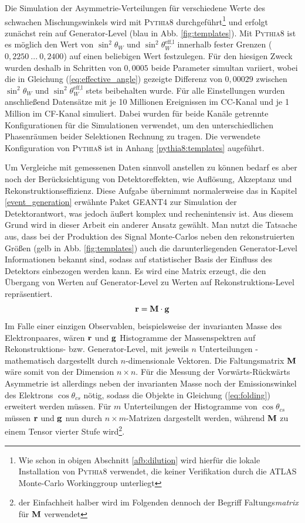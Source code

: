 Die Simulation der Asymmetrie-Verteilungen für verschiedene Werte des schwachen
Mischungswinkels wird mit \textsc{Pythia8} durchgeführt\footnote{Wie schon in
obigen Abschnitt \ref{afb:dilution} wird hierfür die lokale Installation von
\textsc{Pythia8} verwendet, die keiner Verifikation durch die ATLAS Monte-Carlo
Workinggroup unterliegt} und erfolgt zunächst rein auf Generator-Level (blau in
Abb. \ref{fig:templates}). Mit \textsc{Pythia8} ist es möglich den Wert von
$\sin^2\theta_W$ und $\sin^2\theta_W^\text{eff,l}$ innerhalb fester Grenzen
($0,2250 \: ... \: 0,2400$) auf einen beliebigen Wert festzulegen. Für den
hiesigen Zweck wurden deshalb in Schritten von $0,0005$ beide Parameter
simultan variiert, wobei die in Gleichung (\ref{eq:effective_angle}) gezeigte
Differenz von $0,00029$ zwischen $\sin^2\theta_W$ und
$\sin^2\theta_W^\text{eff,l}$ stets beibehalten wurde. Für alle Einstellungen
wurden anschließend Datensätze mit je 10 Millionen Ereignissen im \ac{CC}-Kanal
und je 1 Million im \ac{CF}-Kanal simuliert. Dabei wurden für beide Kanäle
getrennte Konfigurationen für die Simulationen verwendet, um den
unterschiedlichen Phasenräumen beider Selektionen Rechnung zu tragen. Die
verwendete Konfiguration von \textsc{Pythia8} ist in Anhang
\ref{pythia8:templates} augeführt.

Um Vergleiche mit gemessenen Daten sinnvoll anstellen zu können bedarf es
aber noch der Berücksichtigung von Detektoreffekten, wie Auflösung, Akzeptanz
und Rekonstruktionseffizienz. Diese Aufgabe übernimmt normalerweise das in
Kapitel \ref{event_generation} erwähnte Paket \textsc{GEANT4} zur Simulation
der Detektorantwort, was jedoch äußert komplex und rechenintensiv ist. Aus
diesem Grund wird in dieser Arbeit ein anderer Ansatz gewählt. Man nutzt die
Tatsache aus, dass bei der Produktion des Signal Monte-Carlos neben den
rekonstruierten Größen (gelb in Abb. \ref{fig:templates}) auch die
darunterliegenden Generator-Level Informationen bekannt sind, sodass auf
statistischer Basis der Einfluss des Detektors einbezogen werden kann. Es wird
eine Matrix erzeugt, die den Übergang von Werten auf Generator-Level zu Werten
auf Rekonstruktions-Level repräsentiert.
\begin{equation}
    \bf r = M \cdot \bf{g}
    \label{eq:folding}
\end{equation}
Im Falle einer einzigen Observablen, beispielsweise der invarianten Masse des
Elektronpaares, wären $\bf{r}$ und $\bf{g}$ Histogramme der Massenspektren auf
Rekonstruktions- bzw. Generator-Level, mit jeweils $n$ Unterteilungen -
mathematisch dargestellt durch $n$-dimensionale Vektoren. Die Faltungsmatrix
$\bf{M}$ wäre somit von der Dimension $n \times n$. Für die Messung der
Vorwärts-Rückwärts Asymmetrie ist allerdings neben der invarianten Masse noch
der Emissionswinkel des Elektrons $\cos\theta_{cs}$ nötig, sodass die Objekte
in Gleichung (\ref{eq:folding}) erweitert werden müssen. Für $m$ Unterteilungen
der Histogramme von $\cos\theta_{cs}$ müssen $\bf{r}$ und $\bf{g}$ nun durch 
$n \times m$-Matrizen dargestellt werden, während $\bf{M}$ zu einem Tensor
vierter Stufe wird\footnote{der Einfachheit halber wird im Folgenden dennoch
der Begriff Faltungs\textit{matrix} für $\bf{M}$ verwendet}.

